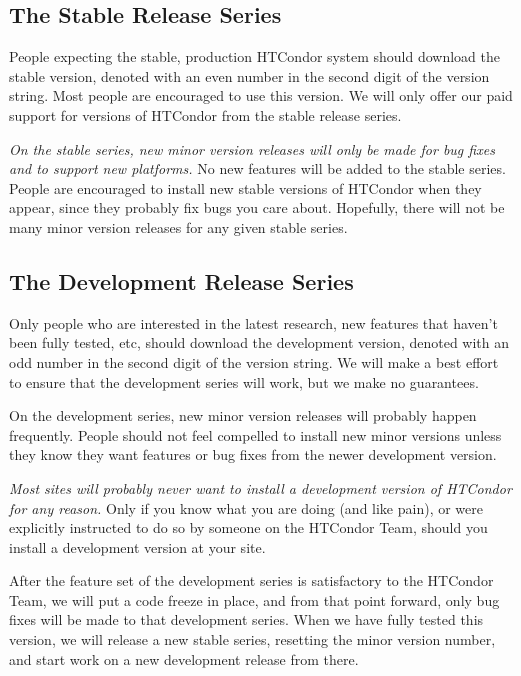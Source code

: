 \subsection{\label{sec:Stable-Series}The Stable Release Series}

People expecting the stable, production HTCondor system should download
the stable version, denoted with an even number in the second digit of
the version string.
Most people are encouraged to use this version.  
We will only offer our paid support for versions of HTCondor from the
stable release series.

\emph{On the stable series, new minor version releases will only
be made for bug fixes and to support new platforms.}
No new features will be added to the stable series.
People are encouraged to install new stable versions of HTCondor when
they appear, since they probably fix bugs you care about.
Hopefully, there will not be many minor version releases for any given
stable series.


\subsection{\label{sec:Developement-Series}
The Development Release Series}

Only people who are interested in the latest research, new features
that haven't been fully tested, etc, should download the development
version, denoted with an odd number in the second digit of the version
string.  
We will make a best effort to ensure that the development series will
work, but we make no guarantees.

On the development series, new minor version releases will probably
happen frequently.
People should not feel compelled to install new minor versions unless
they know they want features or bug fixes from the newer development
version.

\emph{Most sites will probably never want to install a development
version of HTCondor for any reason.}
Only if you know what you are doing (and like pain), or were
explicitly instructed to do so by someone on the HTCondor Team, should
you install a development version at your site.

After the feature set of the development series is satisfactory to the
HTCondor Team, we will put a code freeze in place, and from that point
forward, only bug fixes will be made to that development series.
When we have fully tested this version, we will release a new stable
series, resetting the minor version number, and start work on a new
development release from there.

